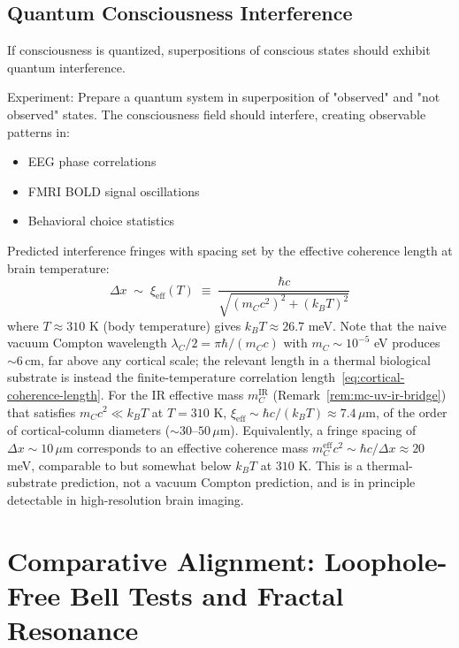 \subsection{Quantum Consciousness Interference}

\begin{proposition}\label{prop:consciousness-interference}
If consciousness is quantized, superpositions of conscious states should exhibit quantum interference.

Experiment: Prepare a quantum system in superposition of "observed" and "not observed" states. The consciousness field should interfere, creating observable patterns in:
\begin{itemize}
\item EEG phase correlations\cite{buzsaki2012}
\item FMRI BOLD signal oscillations\cite{logothetis2001,ogawa1990}
\item Behavioral choice statistics
\end{itemize}

Predicted interference fringes with spacing set by the effective coherence length at brain temperature:
\begin{equation}\label{eq:cortical-coherence-length}
\Delta x \;\sim\; \xi_{\text{eff}}(T) \;\equiv\; \frac{\hbar c}{\sqrt{(m_C c^2)^2 + (k_B T)^2}}
\end{equation}
where $T \approx 310$ K (body temperature) gives $k_B T \approx 26.7$ meV. Note that the naive vacuum Compton wavelength $\lambda_C/2 = \pi\hbar/(m_C c)$ with $m_C \sim 10^{-5}$ eV produces $\sim 6\,$cm, far above any cortical scale; the relevant length in a thermal biological substrate is instead the finite-temperature correlation length~\eqref{eq:cortical-coherence-length}. For the IR effective mass $m_C^{\text{IR}}$ (Remark~\ref{rem:mc-uv-ir-bridge}) that satisfies $m_C c^2 \ll k_B T$ at $T = 310$ K, $\xi_{\text{eff}} \sim \hbar c / (k_B T) \approx 7.4\,\mu$m, of the order of cortical-column diameters ($\sim 30$--$50\,\mu$m). Equivalently, a fringe spacing of $\Delta x \sim 10\,\mu$m corresponds to an effective coherence mass $m_C^{\text{eff}} c^2 \sim \hbar c / \Delta x \approx 20$ meV, comparable to but somewhat below $k_B T$ at $310$ K. This is a thermal-substrate prediction, not a vacuum Compton prediction, and is in principle detectable in high-resolution brain imaging.
\end{proposition}

\section{Comparative Alignment: Loophole-Free Bell Tests and Fractal Resonance}

